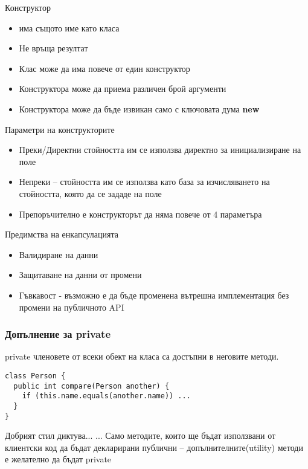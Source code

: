 \documentclass{beamer}
\begin{document}
\begin{frame}{Конструктор}
  \transdissolve
  \begin{itemize}
  \item има същото име като класа
  \item Не връща резултат
  \item Клас може да има повече от един
    конструктор
  \item Конструктора може да приема различен
    брой аргументи
  \item Конструктора може да бъде извикан
    само с ключовата дума \textbf{new}
  \end{itemize}
\end{frame}

\begin{frame}{Параметри на конструкторите}
  \transdissolve
  \begin{itemize}
  \item Преки/Директни 
    стойността им се
    използва директно за инициализиране
    на поле
  \item Непреки – 
    стойността им се
    използва като база за изчисляването на
    стойността, която да се зададе на поле
  \item Препоръчително е конструкторът да няма повече от 4 параметъра
  \end{itemize}
\end{frame}

\begin{frame}{Предимства на енкапсулацията}
  \transdissolve
  \begin{itemize}
  \item Валидиране на данни
  \item Защитаване на данни от промени
  \item Гъвкавост - възможно е да бъде
    променена вътрешна имплементация
    без промени на публичното API
  \end{itemize}
\end{frame}

\begin{frame}[fragile]
  \frametitle{Допълнение за private}
  \transdissolve
    private членовете от всеки обект на
    класа са достъпни в неговите методи.
\begin{lstlisting}
class Person {
  public int compare(Person another) {
    if (this.name.equals(another.name)) ...
  }
}
\end{lstlisting}
\end{frame}

\begin{frame}{Добрият стил диктува...}
  \transdissolve
  ... Само методите, които ще бъдат
  използвани от клиентски код да бъдат
  декларирани публични –
  допълнителните(utility) методи е
  желателно да бъдат private
\end{frame}
\end{document}
